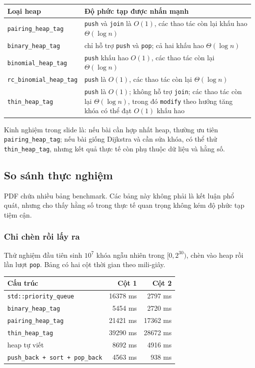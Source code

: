 \documentclass[11pt]{article}
\begin{document}
\begin{center}
\small
\begin{tabular}{|p{}|p{}|}
\hline
Loại heap & Độ phức tạp được nhấn mạnh \\
\hline
\texttt{pairing\_heap\_tag} &
\texttt{push} và \texttt{join} là $O(1)$, các thao tác còn lại khấu hao
$\Theta(\log n)$ \\
\hline
\texttt{binary\_heap\_tag} &
chỉ hỗ trợ \texttt{push} và \texttt{pop}; cả hai khấu hao $\Theta(\log n)$ \\
\hline
\texttt{binomial\_heap\_tag} &
\texttt{push} khấu hao $O(1)$, các thao tác còn lại $\Theta(\log n)$ \\
\hline
\texttt{rc\_binomial\_heap\_tag} &
\texttt{push} là $O(1)$, các thao tác còn lại $\Theta(\log n)$ \\
\hline
\texttt{thin\_heap\_tag} &
\texttt{push} là $O(1)$; không hỗ trợ \texttt{join}; các thao tác còn lại
$\Theta(\log n)$, trong đó \texttt{modify} theo hướng tăng khóa có thể đạt
$O(1)$ khấu hao \\
\hline
\end{tabular}
\end{center}

Kinh nghiệm trong slide là: nếu bài cần hợp nhất heap, thường ưu tiên
\texttt{pairing\_heap\_tag}; nếu bài giống Dijkstra và cần sửa khóa, có thể
thử \texttt{thin\_heap\_tag}, nhưng kết quả thực tế còn phụ thuộc dữ liệu và
hằng số.

\subsection{So sánh thực nghiệm}

PDF chứa nhiều bảng benchmark. Các bảng này không phải là kết luận phổ quát,
nhưng cho thấy hằng số trong thực tế quan trọng không kém độ phức tạp tiệm
cận.

\subsubsection{Chỉ chèn rồi lấy ra}

Thử nghiệm đầu tiên sinh $10^7$ khóa ngẫu nhiên trong $[0,2^{30})$, chèn vào
heap rồi lần lượt \texttt{pop}. Bảng có hai cột thời gian theo mili-giây.

\begin{center}
\small
\begin{tabular}{|l|r|r|}
\hline
Cấu trúc & Cột 1 & Cột 2 \\
\hline
\texttt{std::priority\_queue} & 16378 ms & 2797 ms \\
\texttt{binary\_heap\_tag} & 5454 ms & 2720 ms \\
\texttt{pairing\_heap\_tag} & 21421 ms & 17362 ms \\
\texttt{thin\_heap\_tag} & 39290 ms & 28672 ms \\
heap tự viết & 8692 ms & 4916 ms \\
\texttt{push\_back + sort + pop\_back} & 4563 ms & 938 ms \\
\hline
\end{tabular}
\end{center}
\end{document}
